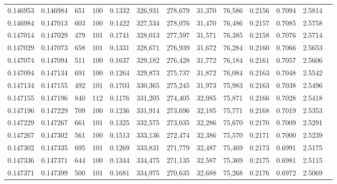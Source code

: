 \begin{tabular}{rrrrrrrrrrrrr}
0.146953 & 0.146984 &   651 & 100 &                                     0.1332 & 326,931 & 278,679 &  31,370 &  76,586 & 0.2156 & 0.7094 & 2.5814 \\
0.146984 & 0.147013 &   603 & 100 &                                     0.1422 & 327,534 & 278,076 &  31,470 &  76,486 & 0.2157 & 0.7085 & 2.5758 \\
0.147014 & 0.147029 &   479 & 101 &                                     0.1741 & 328,013 & 277,597 &  31,571 &  76,385 & 0.2158 & 0.7076 & 2.5714 \\
0.147029 & 0.147073 &   658 & 101 &                                     0.1331 & 328,671 & 276,939 &  31,672 &  76,284 & 0.2160 & 0.7066 & 2.5653 \\
0.147074 & 0.147094 &   511 & 100 &                                     0.1637 & 329,182 & 276,428 &  31,772 &  76,184 & 0.2161 & 0.7057 & 2.5606 \\
0.147094 & 0.147134 &   691 & 100 &                                     0.1264 & 329,873 & 275,737 &  31,872 &  76,084 & 0.2163 & 0.7048 & 2.5542 \\
0.147134 & 0.147155 &   492 & 101 &                                     0.1703 & 330,365 & 275,245 &  31,973 &  75,983 & 0.2163 & 0.7038 & 2.5496 \\
0.147155 & 0.147196 &   840 & 112 &                                     0.1176 & 331,205 & 274,405 &  32,085 &  75,871 & 0.2166 & 0.7028 & 2.5418 \\
0.147196 & 0.147229 &   709 & 100 &                                     0.1236 & 331,914 & 273,696 &  32,185 &  75,771 & 0.2168 & 0.7019 & 2.5353 \\
0.147229 & 0.147267 &   661 & 101 &                                     0.1325 & 332,575 & 273,035 &  32,286 &  75,670 & 0.2170 & 0.7009 & 2.5291 \\
0.147267 & 0.147302 &   561 & 100 &                                     0.1513 & 333,136 & 272,474 &  32,386 &  75,570 & 0.2171 & 0.7000 & 2.5239 \\
0.147302 & 0.147335 &   695 & 101 &                                     0.1269 & 333,831 & 271,779 &  32,487 &  75,469 & 0.2173 & 0.6991 & 2.5175 \\
0.147336 & 0.147371 &   644 & 100 &                                     0.1344 & 334,475 & 271,135 &  32,587 &  75,369 & 0.2175 & 0.6981 & 2.5115 \\
0.147371 & 0.147399 &   500 & 101 &                                     0.1681 & 334,975 & 270,635 &  32,688 &  75,268 & 0.2176 & 0.6972 & 2.5069 \\

\end{tabular}
